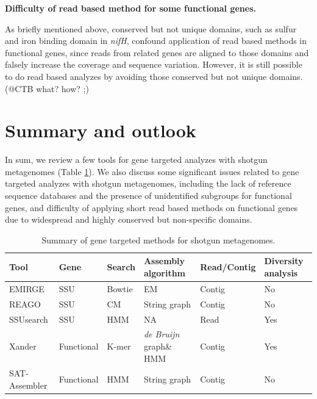\documentclass[]{msu-thesis}
\begin{document}
\textbf{Difficulty of read based method for some functional genes.}

As briefly mentioned above, conserved but not unique domains, such as
sulfur and iron binding domain in \textit{nifH}, confound application
of read based methods in functional genes, since reads from related
genes are aligned to those domains and falsely increase the coverage
and sequence variation. However, it is still possible to do read based
analyzes by avoiding those conserved but not unique domains.
(@CTB what? how? ;)

\section{Summary and outlook}

In sum, we review a few tools for gene targeted analyzes with shotgun
metagenomes (Table \ref{tab:toolSumm}). We also discuss some
significant issues related to gene targeted analyzes with shotgun
metagenomes, including the lack of reference sequence databases and
the presence of unidentified subgroups for functional genes, and
difficulty of applying short read based methods on functional genes
due to widespread and highly conserved but non-specific domains.

\begin{table}[htbp]
  \centering
  \caption[Summary of gene targeted methods for shotgun metagenomes]{Summary of gene targeted methods for shotgun metagenomes.}
    \begin{tabular}{|llllll|}
    \toprule
    Tool  & Gene & Search & Assembly algorithm & Read/Contig & Diversity analysis \\
    \midrule
    EMIRGE & SSU & Bowtie & EM    & Contig & No \\
    REAGO & SSU & CM    & String graph & Contig & No \\
    SSUsearch & SSU & HMM   & NA    & Read  & Yes \\
    Xander & Functional & K-mer & \textit{de Bruijn} graph\& HMM & Contig & Yes \\
    SAT-Assembler & Functional & HMM   & String graph & Contig & No \\
    \bottomrule
    \end{tabular}%
  \label{tab:toolSumm}%
\end{table}%
\end{document}
